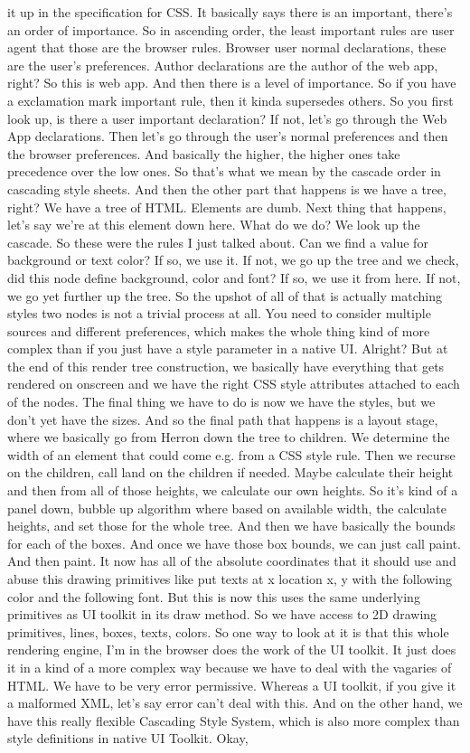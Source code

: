 it up in the specification for CSS. It basically says there is an important, there's an order of importance. So in ascending order, the least important rules are user agent that those are the browser rules. Browser user normal declarations, these are the user's preferences. Author declarations are the author of the web app, right? So this is web app. And then there is a level of importance. So if you have a exclamation mark important rule, then it kinda supersedes others. So you first look up, is there a user important declaration? If not, let's go through the Web App declarations. Then let's go through the user's normal preferences and then the browser preferences. And basically the higher, the higher ones take precedence over the low ones. So that's what we mean by the cascade order in cascading style sheets. And then the other part that happens is we have a tree, right? We have a tree of HTML. Elements are dumb. Next thing that happens, let's say we're at this element down here. What do we do? We look up the cascade. So these were the rules I just talked about. Can we find a value for background or text color? If so, we use it. If not, we go up the tree and we check, did this node define background, color and font? If so, we use it from here. If not, we go yet further up the tree. So the upshot of all of that is actually matching styles two nodes is not a trivial process at all. You need to consider multiple sources and different preferences, which makes the whole thing kind of more complex than if you just have a style parameter in a native UI. Alright? But at the end of this render tree construction, we basically have everything that gets rendered on onscreen and we have the right CSS style attributes attached to each of the nodes. The final thing we have to do is now we have the styles, but we don't yet have the sizes. And so the final path that happens is a layout stage, where we basically go from Herron down the tree to children. We determine the width of an element that could come e.g. from a CSS style rule. Then we recurse on the children, call land on the children if needed. Maybe calculate their height and then from all of those heights, we calculate our own heights. So it's kind of a panel down, bubble up algorithm where based on available width, the calculate heights, and set those for the whole tree. And then we have basically the bounds for each of the boxes. And once we have those box bounds, we can just call paint. And then paint. It now has all of the absolute coordinates that it should use and abuse this drawing primitives like put texts at x location x, y with the following color and the following font. But this is now this uses the same underlying primitives as UI toolkit in its draw method. So we have access to 2D drawing primitives, lines, boxes, texts, colors. So one way to look at it is that this whole rendering engine, I'm in the browser does the work of the UI toolkit. It just does it in a kind of a more complex way because we have to deal with the vagaries of HTML. We have to be very error permissive. Whereas a UI toolkit, if you give it a malformed XML, let's say error can't deal with this. And on the other hand, we have this really flexible Cascading Style System, which is also more complex than style definitions in native UI Toolkit. Okay, 